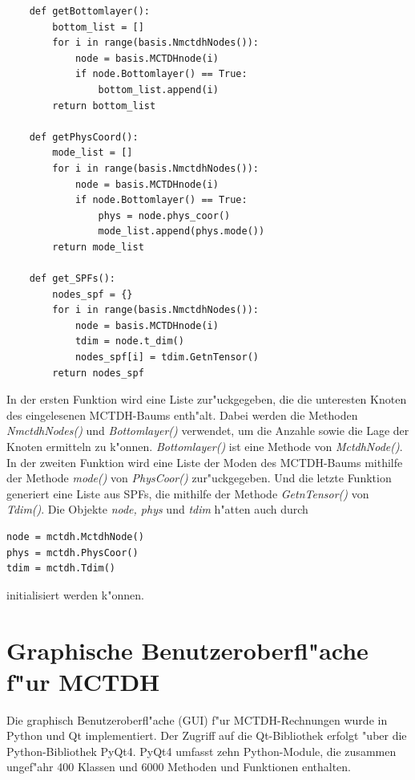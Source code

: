 \begin{verbatim}
    def getBottomlayer():
        bottom_list = []
        for i in range(basis.NmctdhNodes()):
            node = basis.MCTDHnode(i)
            if node.Bottomlayer() == True:
                bottom_list.append(i)
        return bottom_list
    
    def getPhysCoord():
        mode_list = []
        for i in range(basis.NmctdhNodes()):
            node = basis.MCTDHnode(i)
            if node.Bottomlayer() == True:
                phys = node.phys_coor()
                mode_list.append(phys.mode()) 
        return mode_list
    
    def get_SPFs():
        nodes_spf = {}
        for i in range(basis.NmctdhNodes()):
            node = basis.MCTDHnode(i)
            tdim = node.t_dim()
            nodes_spf[i] = tdim.GetnTensor() 
        return nodes_spf
\end{verbatim}

In der ersten Funktion wird eine Liste zur"uckgegeben, die die unteresten Knoten des eingelesenen MCTDH-Baums enth"alt.
Dabei werden die Methoden \textit{NmctdhNodes()} und \textit{Bottomlayer()} verwendet, um die Anzahle sowie die Lage der Knoten
ermitteln zu k"onnen. \textit{Bottomlayer()} ist eine Methode von \textit{MctdhNode()}.
In der zweiten Funktion wird eine Liste der Moden des MCTDH-Baums mithilfe der Methode \textit{mode()} von \textit{PhysCoor()} zur"uckgegeben. 
Und die letzte Funktion generiert eine Liste aus SPFs, die mithilfe der Methode \textit{GetnTensor()} von \textit{Tdim()}.
Die Objekte \textit{node, phys} und \textit{tdim} h"atten auch durch 

\begin{verbatim}
node = mctdh.MctdhNode()
phys = mctdh.PhysCoor()
tdim = mctdh.Tdim()
\end{verbatim}

initialisiert werden k"onnen. 
    

\section{Graphische Benutzeroberfl"ache f"ur MCTDH}

 Die graphisch Benutzeroberfl"ache (GUI) f"ur MCTDH-Rechnungen wurde in Python und Qt implementiert.
 Der Zugriff auf die Qt-Bibliothek erfolgt "uber die Python-Bibliothek PyQt4. 
 PyQt4 umfasst zehn Python-Module, die zusammen ungef"ahr 400 Klassen und 6000 Methoden und Funktionen enthalten. \cite{PyQt}

